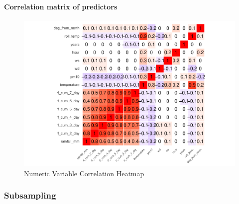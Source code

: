 \documentclass[12pt]{article}
\begin{document}
\hypertarget{correlation-matrix-of-predictors}{%
\paragraph{Correlation matrix of
predictors}\label{correlation-matrix-of-predictors}}

\begin{figure}
\centering
\includegraphics{MATH2269_final_project_files/figure-latex/unnamed-chunk-18-1.pdf}
\caption{Numeric Variable Correlation Heatmap}
\end{figure}

\hypertarget{subsampling}{%
\subsubsection{Subsampling}\label{subsampling}}
\end{document}
